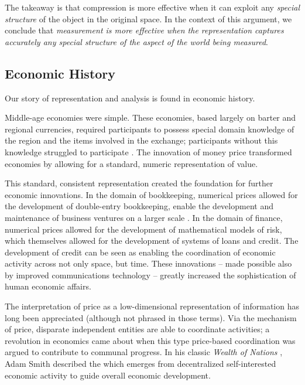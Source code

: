The takeaway is that compression is more effective when it can exploit any \textit{special structure} of the object in the original space.
In the context of this argument, we conclude that \textit{measurement is more effective when the representation captures accurately any special structure of the aspect of the world being measured}.

\bigskip


\subsection{Economic History}

Our story of representation and analysis is found in economic history.

Middle-age economies were simple.
These economies, based largely on barter and regional currencies, required participants to possess special domain knowledge of the region and the items involved in the exchange; participants without this knowledge struggled to participate \citep{heilbroner}.
The innovation of money price transformed economies by allowing for a standard, numeric representation of value.

This standard, consistent representation created the foundation for further economic innovations.
In the domain of bookkeeping, numerical prices allowed for the development of double-entry bookkeeping, enable the development and maintenance of business ventures on a larger scale \citep{ferguson}.
In the domain of finance, numerical prices allowed for the development of mathematical models of risk, which themselves allowed for the development of systems of loans and credit.
The development of credit can be seen as enabling the coordination of economic activity across not only space, but time.
These innovations -- made possible also by improved communications technology -- greatly increased the sophistication of human economic affairs.

\bigskip

The interpretation of price as a low-dimensional representation of information has long been appreciated (although not phrased in those terms).
Via the mechanism of price, disparate independent entities are able to coordinate activities; a revolution in economics came about when this type price-based coordination was argued to contribute to communal progress.
In his classic \textit{Wealth of Nations} \citep{smith}, Adam Smith described the  which emerges from decentralized self-interested economic activity to guide overall economic development.

